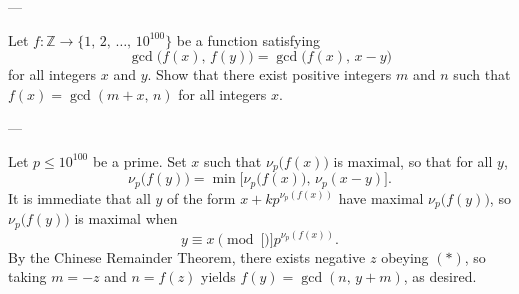 
---

Let $f:\mathbb Z\to\{1,\,2,\,\ldots,\,10^{100}\}$ be a function satisfying \[\gcd\big(f(x),\,f(y)\big)=\gcd\big(f(x),\,x-y\big)\]
for all integers $x$ and $y$. Show that there exist positive integers $m$ and $n$ such that $f(x)=\gcd(m+x,\,n)$ for all integers $x$.

---

Let $p\le 10^{100}$ be a prime. Set $x$ such that $\nu_p\big(f(x)\big)$ is maximal, so that for all $y$, \[\nu_p\big(f(y)\big)=\min\big[\nu_p\big(f(x)\big),\,\nu_p(x-y)\big].\]
It is immediate that all $y$ of the form $x+kp^{\nu_p(f(x))}$ have maximal $\nu_p\big(f(y)\big)$, so $\nu_p\big(f(y)\big)$ is maximal when
\begin{equation}
    y\equiv x\pmod[\Big]{p^{\nu_p(f(x))}}.\tag{$*$}
\end{equation}
By the Chinese Remainder Theorem, there exists negative $z$ obeying $(*)$, so taking $m=-z$ and $n=f(z)$ yields $f(y)=\gcd(n,\,y+m)$, as desired. 
